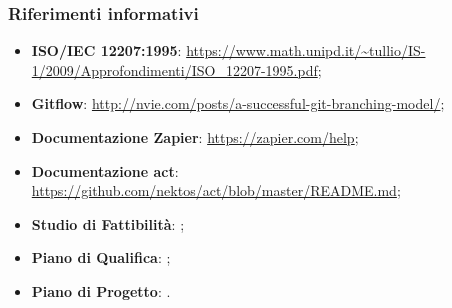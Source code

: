 	\subsubsection{Riferimenti informativi}
	\begin{itemize}
		\item \textbf{ISO/IEC 12207:1995}: \url{https://www.math.unipd.it/~tullio/IS-1/2009/Approfondimenti/ISO_12207-1995.pdf};
		\item \textbf{Gitflow}: \url{http://nvie.com/posts/a-successful-git-branching-model/};
		\item \textbf{Documentazione Zapier}: \url{https://zapier.com/help};
		\item \textbf{Documentazione act}: \url{https://github.com/nektos/act/blob/master/README.md};
		\item \textbf{Studio di Fattibilità}: ;
		\item \textbf{Piano di Qualifica}: ;
		\item \textbf{Piano di Progetto}: .
	\end{itemize}